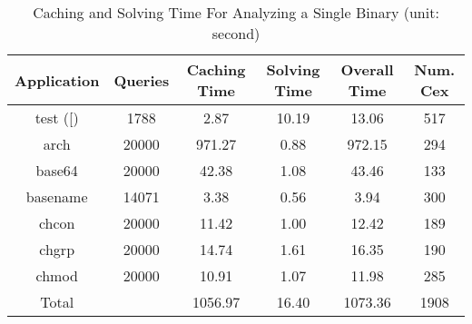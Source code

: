 \begin{table}[ht]
\centering
\begin{tabular}{cccccc}
\hline
\multicolumn{1}{|c|}{Application} & \multicolumn{1}{c|}{Queries} & \multicolumn{1}{c|}{Caching Time} & \multicolumn{1}{c|}{Solving Time} & \multicolumn{1}{c|}{Overall Time} & \multicolumn{1}{c|}{Num. Cex} \\
\hline
\multicolumn{1}{|c|}{{test ([)}}      & \multicolumn{1}{c|}{1788}  & \multicolumn{1}{c|}{2.87}   & \multicolumn{1}{c|}{10.19} & \multicolumn{1}{c|}{13.06}  & \multicolumn{1}{c|}{517} \\ \hline
\multicolumn{1}{|c|}{arch}     & \multicolumn{1}{c|}{20000} & \multicolumn{1}{c|}{971.27} & \multicolumn{1}{c|}{0.88}  & \multicolumn{1}{c|}{972.15} & \multicolumn{1}{c|}{294} \\ \hline
\multicolumn{1}{|c|}{base64}   & \multicolumn{1}{c|}{20000} & \multicolumn{1}{c|}{42.38}  & \multicolumn{1}{c|}{1.08}  & \multicolumn{1}{c|}{43.46}  & \multicolumn{1}{c|}{133} \\ \hline
\multicolumn{1}{|c|}{basename} & \multicolumn{1}{c|}{14071} & \multicolumn{1}{c|}{3.38}   & \multicolumn{1}{c|}{0.56}  & \multicolumn{1}{c|}{3.94}   & \multicolumn{1}{c|}{300} \\ \hline
\multicolumn{1}{|c|}{chcon}    & \multicolumn{1}{c|}{20000} & \multicolumn{1}{c|}{11.42}  & \multicolumn{1}{c|}{1.00}  & \multicolumn{1}{c|}{12.42}  & \multicolumn{1}{c|}{189} \\ \hline
\multicolumn{1}{|c|}{chgrp}    & \multicolumn{1}{c|}{20000} & \multicolumn{1}{c|}{14.74}  & \multicolumn{1}{c|}{1.61}  & \multicolumn{1}{c|}{16.35}  & \multicolumn{1}{c|}{190} \\ \hline
\multicolumn{1}{|c|}{chmod}    & \multicolumn{1}{c|}{20000} & \multicolumn{1}{c|}{10.91}  & \multicolumn{1}{c|}{1.07}  & \multicolumn{1}{c|}{11.98}  & \multicolumn{1}{c|}{285} \\ \hline
Total                          &                            & 1056.97                 & 16.40                  & 1073.36                 & 1908                    
\end{tabular}
\caption{Caching and Solving Time For Analyzing a Single Binary (unit: second)}
\label{single_run}

\vspace{2cm}


\end{table}

